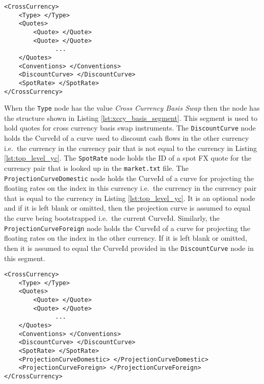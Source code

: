 \begin{lstlisting}[caption=FX forward yield curve segment, label=lst:fx_forward_segment]
<CrossCurrency>
	<Type> </Type>
	<Quotes>
		<Quote> </Quote>
		<Quote> </Quote>
		      ...
	</Quotes>
	<Conventions> </Conventions>
	<DiscountCurve> </DiscountCurve>
	<SpotRate> </SpotRate>
</CrossCurrency>
\end{lstlisting}

When the \lstinline!Type! node has the value \emph{Cross Currency Basis Swap} then the node has the structure shown in 
Listing \ref{lst:xccy_basis_segment}. This segment is used to hold quotes for cross currency basis swap instruments. The 
\lstinline!DiscountCurve! node holds the CurveId of a curve used to discount cash flows in the other currency i.e.\ the 
currency in the currency pair that is not equal to the currency in Listing \ref{lst:top_level_yc}. The 
\lstinline!SpotRate! node holds the ID of a spot FX quote for the currency pair that is looked up in the {\tt market.txt} 
file. The \lstinline!ProjectionCurveDomestic! node holds the CurveId of a curve for projecting the floating rates on the 
index in this currency i.e.\ the currency in the currency pair that is equal to the currency in Listing 
\ref{lst:top_level_yc}. It is an optional node and if it is left blank or omitted, then the projection curve is assumed to 
equal the curve being bootstrapped i.e.\ the current CurveId. Similarly, the \lstinline!ProjectionCurveForeign! node holds 
the CurveId of a curve for projecting the floating rates on the index in the other currency. If it is left blank or 
omitted, then it is assumed to equal the CurveId provided in the \lstinline!DiscountCurve! node in this segment.

\begin{lstlisting}[caption=Cross currency basis yield curve segment, label=lst:xccy_basis_segment]
<CrossCurrency>
	<Type> </Type>
	<Quotes>
		<Quote> </Quote>
		<Quote> </Quote>
		      ...
	</Quotes>
	<Conventions> </Conventions>
	<DiscountCurve> </DiscountCurve>
	<SpotRate> </SpotRate>
	<ProjectionCurveDomestic> </ProjectionCurveDomestic>
	<ProjectionCurveForeign> </ProjectionCurveForeign>
</CrossCurrency>
\end{lstlisting}

